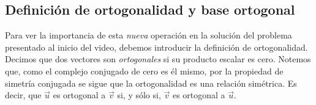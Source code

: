 \documentclass[12pt,dvipsnames]{article}
\numberwithin{equation}{section}
\begin{document}
%

\subsection{Definición de ortogonalidad y base ortogonal}

Para ver la importancia de esta \emph{nueva} operación en la solución del problema presentado al inicio del video, debemos introducir la definición de ortogonalidad. Decimos que dos vectores son \emph{ortogonales} si su producto escalar es cero. Notemos que, como el complejo conjugado de cero es él mismo, por la propiedad de simetría conjugada se sigue que la ortogonalidad es una relación simétrica. Es decir, que $\vec{u}$ es ortogonal a $\vec{v}$ si, y sólo si, $\vec{v}$ es ortogonal a $\vec{u}$.
\end{document}
